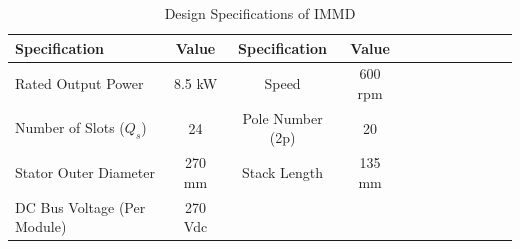 \documentclass[a4paper,11pt]{article}
\begin{document}
\begin{table}[ht!]
\centering
 \caption{Design Specifications of IMMD}
\label{specs}
\begin{tabularx}{\textwidth}{@{}l*{10}{C}c@{}}

\toprule
Specification  &  Value & Specification  &  Value \\ 
\midrule
Rated Output Power & 8.5 kW & Speed & 600 rpm\\ 
Number of Slots ($Q_s$) & 24 & Pole Number (2p) & 20 \\
Stator Outer Diameter & 270 mm & Stack Length & 135 mm \\
DC Bus Voltage (Per Module) & 270 Vdc & & \\

\bottomrule
\end{tabularx}
\end{table}
\end{document}
